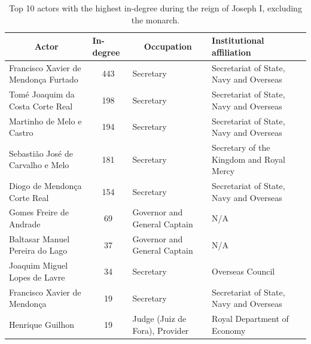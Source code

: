 \documentclass{article}
\begin{document}
\begin{table}[]
	\vspace{0.2cm}
	\centering
	\caption{Top 10 actors with the highest in-degree during the reign of Joseph I, excluding the monarch. \label{tb:in_joseph}}
	\vspace{0.2cm}
	\begin{tabular}{|p{4cm}|c|p{4cm}|p{4cm}|}
		\hline
		\multicolumn{1}{|c|}{Actor}          & \multicolumn{1}{l|}{In-degree} & \multicolumn{1}{c|}{Occupation}                     & \multicolumn{1}{l|}{Institutional affiliation} \\ \hline
		Francisco Xavier de Mendonça Furtado & 443                            & Secretary                                           & Secretariat of State, Navy and Overseas        \\ \hline
		Tomé Joaquim da Costa Corte Real     & 198                            & Secretary                                           & Secretariat of State, Navy and Overseas        \\ \hline
		Martinho de Melo e Castro            & 194                            & Secretary                                           & Secretariat of State, Navy and Overseas        \\ \hline
		Sebastião José de Carvalho e Melo    & 181                            & Secretary                                           & Secretary of the Kingdom and Royal Mercy       \\ \hline
		Diogo de Mendonça Corte Real         & 154                            & Secretary                                           & Secretariat of State, Navy and Overseas        \\ \hline
		Gomes Freire de Andrade              & 69                             & Governor and General Captain                        & N/A                                            \\ \hline
		Baltasar Manuel Pereira do Lago      & 37                             & Governor and General Captain                        & N/A                                            \\ \hline
		Joaquim Miguel Lopes de Lavre        & 34                             & \multicolumn{1}{l|}{Secretary}                      & Overseas Council                               \\ \hline
		Francisco Xavier de Mendonça         & 19                             & \multicolumn{1}{l|}{Secretary}                      & Secretariat of State, Navy and Overseas        \\ \hline
		Henrique Guilhon                     & 19                             & \multicolumn{1}{l|}{Judge (Juiz de Fora), Provider} & Royal Department of Economy                    \\ \hline
	\end{tabular}
\end{table}
\end{document}
